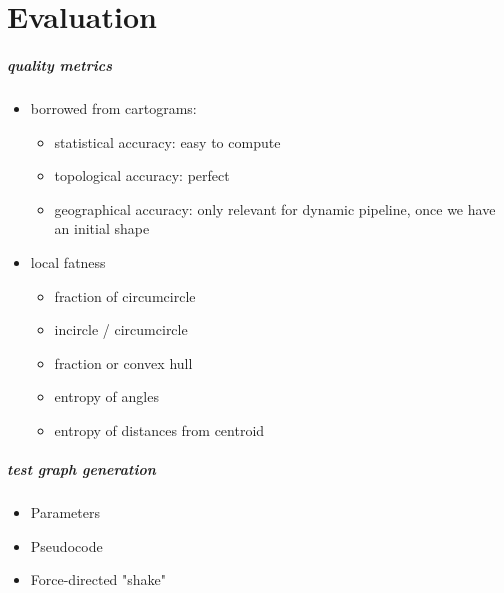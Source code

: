 \chapter{Evaluation}
\label{chap:evaluation}

\paragraph{quality metrics}
\begin{itemize}
	\item borrowed from cartograms: \begin{itemize}
		\item statistical accuracy: easy to compute
		\item topological accuracy: perfect
		\item geographical accuracy: only relevant for dynamic pipeline, once we have an initial shape
	\end{itemize}
	\item local fatness \begin{itemize}
		\item fraction of circumcircle
		\item incircle / circumcircle
		\item fraction or convex hull
		\item entropy of angles
		\item entropy of distances from centroid
	\end{itemize}
\end{itemize}

\paragraph{test graph generation}
\begin{itemize}
	\item Parameters
	\item Pseudocode
	\item Force-directed "shake"
\end{itemize}
